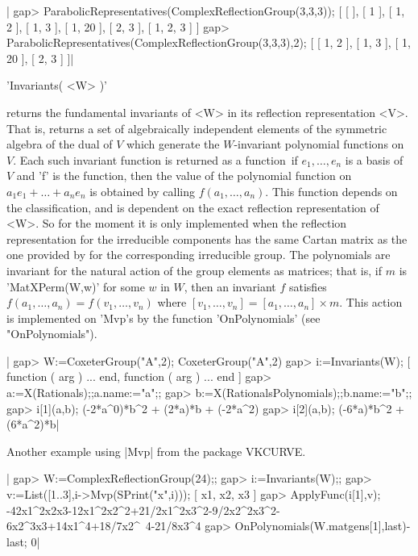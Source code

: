 |    gap> ParabolicRepresentatives(ComplexReflectionGroup(3,3,3));
    [ [  ], [ 1 ], [ 1, 2 ], [ 1, 3 ], [ 1, 20 ], [ 2, 3 ], [ 1, 2, 3 ] ]
    gap> ParabolicRepresentatives(ComplexReflectionGroup(3,3,3),2);
    [ [ 1, 2 ], [ 1, 3 ], [ 1, 20 ], [ 2, 3 ] ]|


'Invariants( <W> )'

returns  the fundamental invariants of <W> in its reflection representation
<V>.  That is, returns  a set of  algebraically independent elements of the
symmetric  algebra  of  the  dual  of  $V$ which generate the $W$-invariant
polynomial  functions on $V$. Each such invariant function is returned as a
{\GAP}  function\:\ if $e_1,\ldots,e_n$  is a basis  of $V$ and  'f' is the
{\GAP}   function,   then   the   value   of  the  polynomial  function  on
$a_1e_1+\ldots+a_n  e_n$ is  obtained by  calling $f(a_1,\ldots,a_n)$. This
function  depends  on  the  classification,  and  is dependent on the exact
reflection  representation of <W>. So for the moment it is only implemented
when  the reflection representation for  the irreducible components has the
same  Cartan matrix as the one  provided by {\CHEVIE} for the corresponding
irreducible  group. The polynomials are invariant for the natural action of
the group elements as matrices; that is, if $m$ is 'MatXPerm(W,w)' for some
$w$   in  $W$,   then  an   invariant  $f$   satisfies  $f(a_1,\ldots,a_n)=
f(v_1,\ldots,v_n)$  where $[v_1,\ldots,v_n]=[a_1,\ldots,a_n]\times m$. This
action  is  implemented  on  'Mvp's  by  the  function 'OnPolynomials' (see
"OnPolynomials").

|    gap> W:=CoxeterGroup("A",2);
    CoxeterGroup("A",2)
    gap> i:=Invariants(W);
    [ function ( arg ) ... end, function ( arg ) ... end ]
    gap> a:=X(Rationals);;a.name:="a";;
    gap> b:=X(RationalsPolynomials);;b.name:="b";;
    gap> i[1](a,b);
    (-2*a^0)*b^2 + (2*a)*b + (-2*a^2)
    gap> i[2](a,b);
    (-6*a)*b^2 + (6*a^2)*b|

Another example using |Mvp| from the package VKCURVE.

|    gap> W:=ComplexReflectionGroup(24);;
    gap> i:=Invariants(W);;
    gap> v:=List([1..3],i->Mvp(SPrint("x",i)));
    [ x1, x2, x3 ]
    gap> ApplyFunc(i[1],v);
    -42x1^2x2x3-12x1^2x2^2+21/2x1^2x3^2-9/2x2^2x3^2-6x2^3x3+14x1^4+18/7x2^\
    4-21/8x3^4
    gap> OnPolynomials(W.matgens[1],last)-last;
    0|

